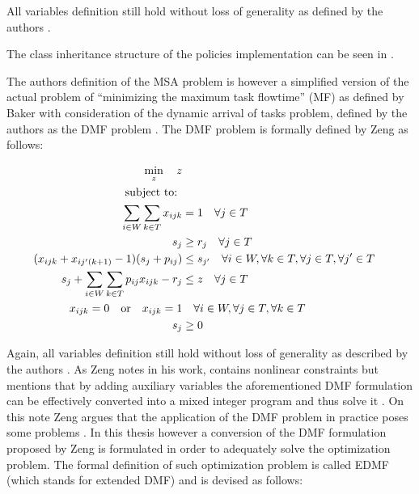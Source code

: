 \documentclass{seal_thesis}
\begin{document}
All variables definition still hold without loss of generality as defined by the authors \cite[pp. 5-7]{Zeng2005}.

The class inheritance structure of the policies implementation can be seen in .


The authors definition of the MSA problem is however a simplified version of the actual problem of ``minimizing the maximum task flowtime'' (MF) as defined by Baker \cite{Baker1974} with consideration of the dynamic arrival of tasks problem, defined by the authors as the DMF problem \cite{Zeng2005}. The DMF problem is formally defined by Zeng as follows:

\begin{align}
    \min_z \quad z\\
    \text{subject to: } \notag \\
    \sum_{i \in W} \sum_{k \in T} x_{ijk} &= 1 \quad \forall j \in T\\
    s_j &\geq r_j \quad \forall j \in T\\
    (x_{ijk} + x_{ij'(k+1)} - 1)(s_j + p_{ij}) &\leq s_{j'} \quad \forall i \in W, \forall k \in T, \forall j \in T, \forall j' \in T \label{eq:nonlinear_constraints_dmf}\\
    s_j + \sum_{i \in W} \sum_{k \in T} p_{ij} x_{ijk} - r_j &\leq z \quad \forall j \in T\\
    x_{ijk} = 0 \quad \text{or} \quad x_{ijk} = 1 &\quad \forall i \in W, \forall j \in T, \forall k \in T\\
    s_j &\geq 0
\end{align}

Again, all variables definition still hold without loss of generality as described by the authors \cite[p. 6]{Zeng2005}. As Zeng notes in his work,  contains nonlinear constraints but mentions that by adding auxiliary variables the aforementioned DMF formulation can be effectively converted into a mixed integer program and thus solve it \cite[p. 6]{Zeng2005}. On this note Zeng argues that the application of the DMF problem in practice poses some problems \cite{Zeng2005}. In this thesis however a conversion of the DMF formulation proposed by Zeng is formulated in order to adequately solve the optimization problem. The formal definition of such optimization problem is called EDMF (which stands for extended DMF) and is devised as follows:
\end{document}
